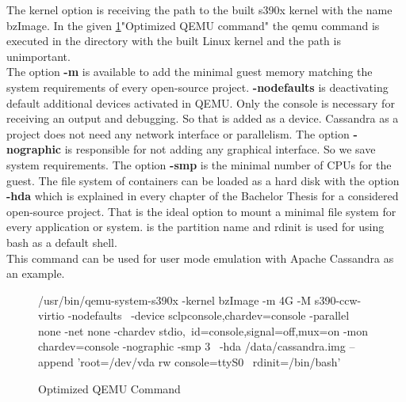 The kernel option is receiving the path to the built s390x kernel with the name bzImage. In the given \ref{QEMU-Command}"Optimized QEMU command" the qemu command is executed in the directory with the built Linux kernel and the path is unimportant. \\ 
The option \textbf{-m} is available to add the minimal guest memory matching the system requirements of every open-source project. 
\textbf{-nodefaults} is deactivating default additional devices activated in QEMU. 
Only the console is necessary for receiving an output and debugging. 
So that is added as a device. Cassandra as a project does not need any network interface or parallelism. The 
option \textbf{-nographic} is responsible for not adding any graphical interface. 
So we save system requirements. The option \textbf{-smp} is the minimal number of CPUs for the guest. 
The file system of containers can be loaded as a hard disk with the option \textbf{-hda} which is explained in every chapter of the Bachelor Thesis for a considered open-source project. 
That is the ideal option to mount a minimal file system for every application or system. 
 is the partition name and rdinit is used for using bash as a default shell. \\
This command can be used for user mode emulation with Apache Cassandra as an example.


\begin{figure}[H]
\centering
\begin{boxedverbatim}
/usr/bin/qemu-system-s390x -kernel bzImage -m 4G -M s390-ccw-virtio -nodefaults \
-device sclpconsole,chardev=console -parallel none -net none -chardev stdio,\
id=console,signal=off,mux=on -mon chardev=console -nographic -smp 3 \
-hda /data/cassandra.img  --append 'root=/dev/vda rw console=ttyS0 \
rdinit=/bin/bash'
\end{boxedverbatim}
 \caption{Optimized QEMU Command}
    \label{QEMU-Command}
\end{figure}

